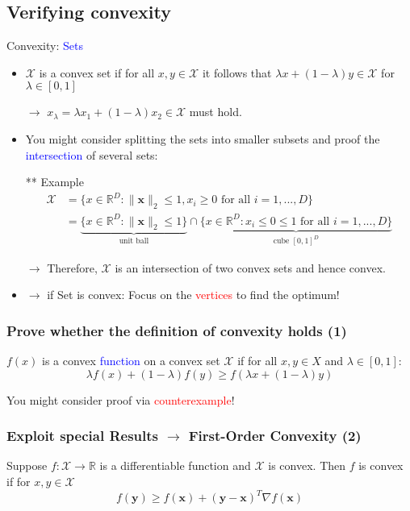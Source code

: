 \documentclass[a4paper,10pt,twoside=true,DIV=10,headsepline,plainheadsepline]{scrartcl}
\begin{document}
		\subsection{Verifying convexity}
		Convexity: \textcolor{blue}{Sets}
			\begin{itemize}
 				\item $\mathcal{X}$ is a convex set if for all $x, y \in \mathcal{X}$ it follows that $\lambda x + (1 − \lambda)y \in \mathcal{X}$ for $\lambda \in [0,1]$ 

	$\rightarrow$ $x_{\lambda} = \lambda x_1 + (1 − \lambda)x_2  \in \mathcal{X}$ must hold.
				\item You might consider splitting the sets into smaller subsets and proof the \textcolor{blue}{intersection} of several sets:

				** Example
				\begin{align}
					\mathcal{X} &= \big \{ x \in \mathbb{R}^D : \| \mathbf{x} \|_2 \leq 1 , x_i \geq 0 \textrm{ for all } i = 1, ... , D \big \} \\
					&= \underbrace{\big \{ x \in \mathbb{R}^D : \| \mathbf{x} \|_2 \leq 1 \big\}}_{\textrm{unit ball}}  \cap \underbrace{\big \{ x \in \mathbb{R}^D : x_i \leq 0 \leq 1 \textrm{ for all } i = 1, ... , D \big \}}_{\textrm{cube } [0,1]^D}
				\end{align}

				$\rightarrow$ Therefore, $\mathcal{X}$ is an intersection of two convex sets and hence convex.
				\item $\rightarrow$ if Set is convex: Focus on the \textcolor{red}{vertices} to find the optimum!
			\end{itemize}


		\subsubsection{Prove whether the definition of convexity holds (1)}
		$f(x)$ is a convex \textcolor{blue}{function} on a convex set $\mathcal{X}$ if
		for all $x, y \in X$ and $\lambda \in [0,1]$:
		\begin{equation} 
			\lambda f(x) + (1 − \lambda) f(y) \ge f(\lambda x + (1 − \lambda) y)	
		\end{equation}
		\newline

		You might consider proof via \textcolor{red}{counterexample}! 

		\subsubsection{Exploit special Results $\rightarrow$ First-Order Convexity (2)}
		Suppose $f: \mathcal{X} \rightarrow \mathbb{R}$ is a differentiable function and $\mathcal{X}$ is convex. Then $f$ is convex if for $x,y \in \mathcal{X}$
			\begin{equation} 
				f(\mathbf{y}) \geq f(\mathbf{x}) + (\mathbf{y} - \mathbf{x})^T \nabla f(\mathbf{x})
			\end{equation}
			\newline
\end{document}
